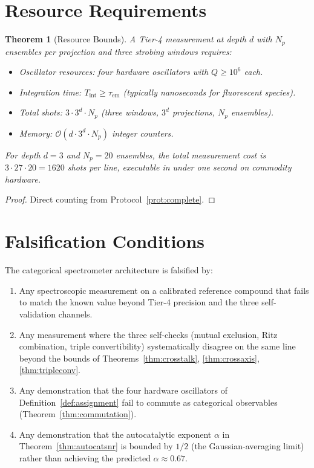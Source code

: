 \documentclass[twocolumn,11pt,a4paper]{article}
\theoremstyle{thmstyle}
\newtheorem{theorem}{Theorem}[section]
\theoremstyle{axiomstyle}
\theoremstyle{definition}
\theoremstyle{remark}
\begin{document}
\section{Resource Requirements}
\label{sec:methods_resources}

\begin{theorem}[Resource Bounds]\label{thm:resources}
A Tier-4 measurement at depth $d$ with $N_{p}$ ensembles per projection and three strobing windows requires:
\begin{itemize}[nosep]
\item \emph{Oscillator resources:} four hardware oscillators with $Q\geq 10^{6}$ each.
\item \emph{Integration time:} $T_{\mathrm{int}}\geq\tau_{\mathrm{em}}$ (typically nanoseconds for fluorescent species).
\item \emph{Total shots:} $3\cdot 3^{d}\cdot N_{p}$ (three windows, $3^{d}$ projections, $N_{p}$ ensembles).
\item \emph{Memory:} $\mathcal{O}(d\cdot 3^{d}\cdot N_{p})$ integer counters.
\end{itemize}
For depth $d=3$ and $N_{p}=20$ ensembles, the total measurement cost is $3\cdot 27\cdot 20=1620$ shots per line, executable in under one second on commodity hardware.
\end{theorem}

\begin{proof}
Direct counting from Protocol~\ref{prot:complete}.
\end{proof}

\section{Falsification Conditions}
\label{sec:methods_falsify}

The categorical spectrometer architecture is falsified by:
\begin{enumerate}[nosep]
\item Any spectroscopic measurement on a calibrated reference compound that fails to match the known value beyond Tier-4 precision and the three self-validation channels.
\item Any measurement where the three self-checks (mutual exclusion, Ritz combination, triple convertibility) systematically disagree on the same line beyond the bounds of Theorems~\ref{thm:crosstalk}, \ref{thm:crossaxis}, \ref{thm:tripleconv}.
\item Any demonstration that the four hardware oscillators of Definition~\ref{def:assignment} fail to commute as categorical observables (Theorem~\ref{thm:commutation}).
\item Any demonstration that the autocatalytic exponent $\alpha$ in Theorem~\ref{thm:autocatsnr} is bounded by $1/2$ (the Gaussian-averaging limit) rather than achieving the predicted $\alpha\approx 0.67$.
\end{enumerate}
\end{document}
